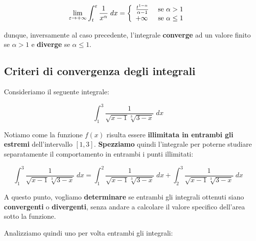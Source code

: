 \documentclass[a4paper, 12pt]{report}
\begin{document}
    $$
    \lim_{\varepsilon \to +\infty} \int_{t}^{\varepsilon} \frac{1}{x^{\alpha}} \; dx = \left \{ \begin{array}{l l}
            \frac{t^{1-\alpha}}{\alpha-1} & \text{ se } \alpha > 1 \\
            +\infty & \text{ se } \alpha \leq 1
    \end{array} \right .
    $$
    
    dunque, inversamente al caso precedente, l'integrale \textbf{converge} ad un valore finito se $\alpha > 1$ e \textbf{diverge} se $\alpha \leq 1$.
    
    \newpage
    
    \subsection{Criteri di convergenza degli integrali}
    
    Consideriamo il seguente integrale:
    
    \[ \int_{1}^{3} \frac{1}{\sqrt{x-1} \sqrt[3]{3-x}} \; dx\]
    
    Notiamo come la funzione $f(x)$ risulta essere \textbf{illimitata in entrambi gli estremi} dell'intervallo $[1, 3]$. \textbf{Spezziamo} quindi l'integrale per poterne studiare separatamente il comportamento in entrambi i punti illimitati:
    
    \[ \int_{1}^{3} \frac{1}{\sqrt{x-1} \sqrt[3]{3-x}} \; dx = \int_{1}^{2} \frac{1}{\sqrt{x-1} \sqrt[3]{3-x}} \; dx + \int_{2}^{3} \frac{1}{\sqrt{x-1} \sqrt[3]{3-x}} \; dx\]
    
    A questo punto, vogliamo \textbf{determinare} se entrambi gli integrali ottenuti siano \textbf{convergenti} o \textbf{divergenti}, senza andare a calcolare il valore specifico dell'area sotto la funzione.
    
    Analizziamo quindi uno per volta entrambi gli integrali:
    
\end{document}
